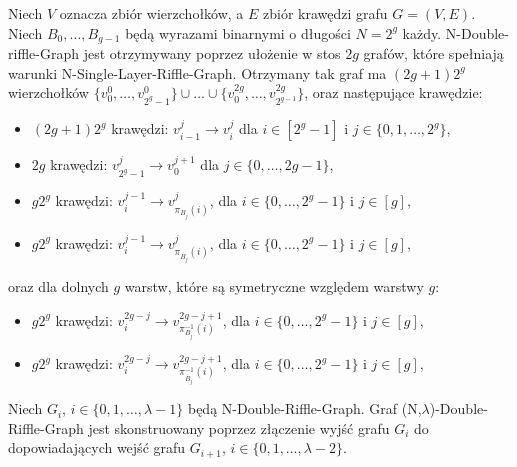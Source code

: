 \begin{definition} \label{rs::ndrg} Niech $V$ oznacza zbiór wierzchołków, a $E$ zbiór krawędzi grafu $G =(V, E)$. Niech $B_{0},\dots,B_{g-1}$ będą wyrazami binarnymi o długości $N = 2^{g}$ każdy.
	N-Double-riffle-Graph jest otrzymywany poprzez ułożenie w stos $2g$ grafów, które spełniają warunki N-Single-Layer-Riffle-Graph. Otrzymany tak graf ma $(2g+1)2^{g}$ wierzchołków $ \{ v_{0}^{0}, \dots , v_{2^{g} - 1}^{0} \} \cup \dots \cup \{ v_{0}^{2g},\dots,v_{2^{g - 1}}^{2g} \} $,
	oraz następujące krawędzie:
	\begin{itemize}
		\item $(2g + 1)2^{g}$ krawędzi: $v_{i-1}^{j} \rightarrow v_{i}^{j}$ dla $i \in [2^{g}-1]$ i $j \in \{0,1,\dots,2^{g} \}$,
		
		\item $2g$ krawędzi: $v_{2^{g} - 1}^{j} \rightarrow v_{0}^{j+1}$ dla $j \in \{0,\dots,2g-1 \} $,
		
		\item $g2^{g}$ krawędzi: $v_{i}^{j-1} \rightarrow v_{\pi_{B_{j}}(i)}^{j}$, dla $i \in \{0,\dots,2^{g} -1\}$ i $j \in [g]$,
		
		\item $g2^{g}$ krawędzi: $v_{i}^{j-1} \rightarrow v_{\pi_{\overline{B}_{j}}(i)}^{j}$, dla $i \in \{0,\dots,2^{g} -1\}$ i $j \in [g]$,
	\end{itemize}
	oraz dla dolnych $g$ warstw, które są symetryczne względem warstwy $g$:
	\begin{itemize}
		\item $g2^{g}$ krawędzi: $v_{i}^{2g - j} \rightarrow v_{\pi_{B_{j}}^{-1}(i)}^{2g -j + 1}$, dla $i \in \{0,\dots,2^{g} -1\}$ i $j \in [g]$,

		\item $g2^{g}$ krawędzi: $v_{i}^{2g - j} \rightarrow v_{\pi_{\overline{B}_{j}}^{-1}(i)}^{2g - j + 1}$, dla $i \in \{0,\dots,2^{g} -1\}$ i $j \in [g]$,
	\end{itemize}

\end{definition}


\begin{definition} \label{rs::nldouble} Niech $G_{i}$, $i \in \{ 0,1,\dots,\lambda - 1\}$ będą N-Double-Riffle-Graph. Graf (N,$\lambda$)-Double-Riffle-Graph jest skonstruowany poprzez złączenie wyjść grafu $G_{i}$ do dopowiadających wejść grafu $G_{i+1}$, $i \in \{ 0, 1, \dots, \lambda - 2\}$.
\end{definition}

